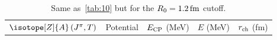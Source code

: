 \documentclass[aps,prc,twocolumn,superscriptaddress,showpacs,floatfix,nofootinbib]{revtex4-1}
\begin{document}
\begin{table}[htb]
\centering
\caption[]{Same as~\cref{tab:10} but for the $R_0=1.2\,\rm fm$ cutoff.}
\begin{tabular}{llccc}
\hline\hline
$\isotope[Z]{A}\,(J^\pi,T)$ & Potential & $E_{\rm CP}$ (MeV) & $E$ (MeV) & $r_{\rm ch}$ (fm) \\

\end{tabular}
\end{table}
\end{document}

